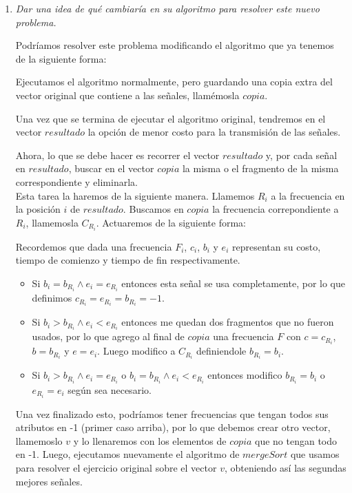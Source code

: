 \begin{enumerate}
	\item \textit{Dar una idea de qué cambiaría en su algoritmo para resolver este nuevo problema.}

        Podríamos resolver este problema modificando el algoritmo que ya tenemos de la siguiente forma:

        Ejecutamos el algoritmo normalmente, pero guardando una copia extra del vector original que contiene a las señales, llamémosla $copia$.

        Una vez que se termina de ejecutar el algoritmo original, tendremos en el vector $resultado$ la opción de menor costo para la transmisión de las señales.

        Ahora, lo que se debe hacer es recorrer el vector $resultado$ y, por cada señal en $resultado$, buscar en el vector $copia$ la misma o el fragmento de la misma correspondiente y eliminarla.\\

        Esta tarea la haremos de la siguiente manera. Llamemos $R_{i}$ a la frecuencia en la posición $i$ de $resultado$. Buscamos en $copia$ la frecuencia correpondiente a $R_{i}$, llamemosla $C_{R_{i}}$. Actuaremos de la siguiente forma:

        Recordemos que dada una frecuencia $F_{i}$, $c_{i}$, $b_{i}$ y $e_{i}$ representan su costo, tiempo de comienzo y tiempo de fin respectivamente.
        \begin{itemize}

          \item Si $b_{i} = b_{R_{i}} \land e_{i} = e_{R_{i}}$ entonces esta señal se usa completamente, por lo que definimos $c_{R_{i}} = e_{R_{i}} = b_{R_{i}} = -1$.

          \item  Si $b_{i} > b_{R_{i}} \land e_{i} < e_{R_{i}}$ entonces me quedan dos fragmentos que no fueron usados, por lo que agrego al final de $copia$ una frecuencia $F$ con $c = c_{R_{i}}$, $b = b_{R_{i}}$ y $e = e_{i}$. Luego modifico a $C_{R_{i}}$ definiendole $b_{R_{i}} = b_{i}$.

          \item Si $b_{i} > b_{R_{i}} \land e_{i} = e_{R_{i}}$ o $b_{i} = b_{R_{i}} \land e_{i} < e_{R_{i}}$ entonces modifico $b_{R_{i}} = b_{i}$ o $e_{R_{i}} = e_{i}$ según sea necesario.

		\end{itemize}

		Una vez finalizado esto, podríamos tener frecuencias que tengan todos sus atributos en -1 (primer caso arriba), por lo que debemos crear otro vector, llamemoslo $v$ y lo llenaremos con los elementos de $copia$ que no tengan todo en -1. Luego, ejecutamos nuevamente el algoritmo de $mergeSort$ que usamos para resolver el ejercicio original sobre el vector $v$, obteniendo así las segundas mejores señales. \\


\end{enumerate}
